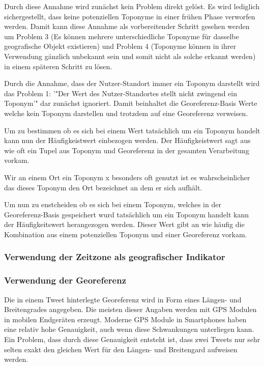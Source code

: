 						Durch diese Annahme wird zunächst kein Problem direkt gelöst. 
						Es wird lediglich sichergestellt, dass keine potenziellen Toponyme in einer frühen Phase verworfen werden. 
						Damit kann diese Annahme als vorbereitender Schritt gesehen werden um Problem 3 (Es können mehrere unterschiedliche Toponyme für dasselbe geografische Objekt existieren) und Problem 4 (Toponyme können in ihrer Verwendung gänzlich unbekannt sein und somit nicht als solche erkannt werden) in einem späteren Schritt zu lösen. 


						Durch die Annahme, dass der Nutzer-Standort immer ein Toponym darstellt wird das Problem 1: '"Der Wert des Nutzer-Standortes stellt nicht zwingend ein Toponym'" dar zunächst ignoriert.
						Damit beinhaltet die Georeferenz-Basis Werte welche kein Toponym darstellen und trotzdem auf eine Georeferenz verweisen. 

						Um zu bestimmen ob es sich bei einem Wert tatsächlich um ein Toponym handelt kann nun der Häufigkeistwert einbezogen werden.
						Der Häufigkeistwert sagt aus wie oft ein Tupel aus Toponym und Georeferenz in der gesamten Verarbeitung vorkam.

						Wir an einem Ort ein Toponym x besonders oft genutzt ist es wahrscheinlicher das dieses Toponym den Ort bezeichnet an dem er sich aufhält. 



					Um nun zu enstcheiden ob es sich bei einem Toponym, welches in der Georeferenz-Basis gespeichert wurd tatsächlich um ein Toponym handelt kann der Häufigkeitswert herangezogen werden. 
					Dieser Wert gibt an wie häufig die Kombination aus einem potenziellen Toponym und einer Georeferenz vorkam.
					

					\subsubsection{Verwendung der Zeitzone als geografischer Indikator}


					\subsubsection{Verwendung der Georeferenz}  
						Die in einem Tweet hinterlegte Georeferenz wird in Form eines Längen- und Breitengrades angegeben.
						Die meisten dieser Angaben werden mit GPS Modulen in mobilen Endgeräten erzeugt. 
						Moderne GPS Module in Smartphones haben eine relativ hohe Genauigkeit, auch wenn diese Schwankungen unterliegen kann.
						Ein Problem, dass durch diese Genauigkeit entsteht ist, dass zwei Tweets nur sehr selten exakt den gleichen Wert für den Längen- und Breitengard aufweisen werden.

